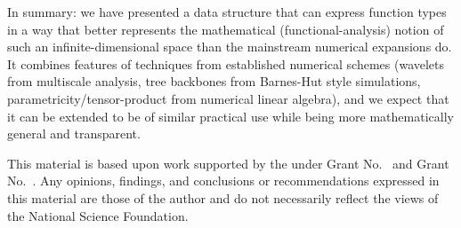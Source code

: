 \documentclass[final,sigplan]{acmart}\settopmatter{printfolios=true,printccs=false,printacmref=false}
\theoremstyle{acmplain}
\theoremstyle{acmdefinition}
\begin{document}
In summary: we have presented a data structure that can express function types in a way that better represents the mathematical (functional-analysis) notion of such an infinite-dimensional space than the mainstream numerical expansions do.
It combines features of techniques from established numerical schemes (wavelets from multiscale analysis, tree backbones from Barnes-Hut style simulations, pa\-ra\-met\-ri\-ci\-ty/ten\-sor-pro\-duct from numerical linear algebra), and we expect that it can be extended to be of similar practical use while being more mathematically general and transparent.

\begin{acks}                            %
  This material is based upon work supported by the
   under Grant
  No.~ and Grant
  No.~.  Any opinions, findings, and
  conclusions or recommendations expressed in this material are those
  of the author and do not necessarily reflect the views of the
  National Science Foundation.
\end{acks}


%
\end{document}
